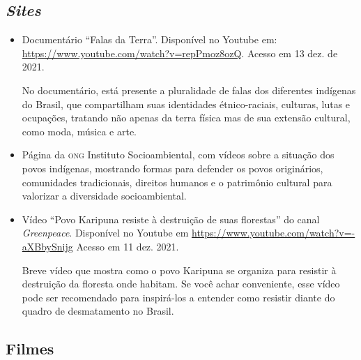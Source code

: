 \documentclass[11pt]{extarticle}
\begin{document}
\subsection{\textit{Sites}}

\begin{itemize}
\item Documentário “Falas da Terra”. Disponível no Youtube em: \url{https://www.youtube.com/watch?v=repPmoz8ozQ}. 
Acesso em 13 dez. de 2021.

No documentário, está presente a pluralidade de falas dos diferentes indígenas do Brasil, que compartilham suas identidades étnico-raciais, culturas, lutas e ocupações, tratando não apenas da terra física mas de sua extensão cultural, como moda, música e arte.

\item Página da \textsc{ong} Instituto Socioambiental, com vídeos sobre a situação dos povos indígenas, mostrando formas para defender os povos originários, comunidades tradicionais, direitos humanos e o patrimônio cultural para valorizar a diversidade socioambiental. 

\item Vídeo “Povo Karipuna resiste à destruição de suas florestas” do canal \textit{Greenpeace}. Disponível no Youtube em \url{https://www.youtube.com/watch?v=-aXBbySnijg} Acesso em 11 dez. 2021. 

Breve vídeo que mostra como o povo Karipuna se organiza para resistir à destruição da floresta onde habitam. Se você achar conveniente, esse vídeo pode ser recomendado para inspirá-los a entender como resistir diante do quadro de desmatamento no Brasil. 
\end{itemize}

\subsection{Filmes}
\end{document}
